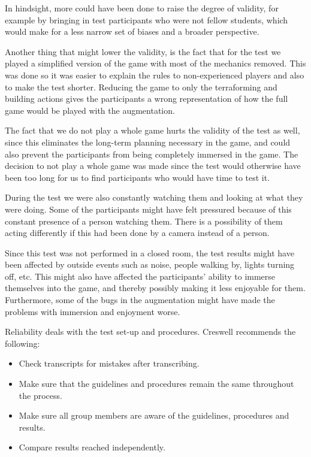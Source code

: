 In hindsight, more could have been done to raise the degree of validity, for example by bringing in test participants who were not fellow students, which would make for a less narrow set of biases and a broader perspective.

Another thing that might lower the validity, is the fact that for the test we played a simplified version of the game with most of the mechanics removed. This was done so it was easier to explain the rules to non-experienced players and also to make the test shorter. Reducing the game to only the terraforming and building actions gives the participants a wrong representation of how the full game would be played with the augmentation.

The fact that we do not play a whole game hurts the validity of the test as well, since this eliminates the long-term planning necessary in the game, and could also prevent the participants from being completely immersed in the game. The decision to not play a whole game was made since the test would otherwise have been too long for us to find participants who would have time to test it.

During the test we were also constantly watching them and looking at what they were doing. Some of the participants might have felt pressured because of this constant presence of a person watching them. There is a possibility of them acting differently if this had been done by a camera instead of a person.   

Since this test was not performed in a closed room, the test results might have been affected by outside events such as noise, people walking by, lights turning off, etc. This might also have affected the participants' ability to immerse themselves into the game, and thereby possibly making it less enjoyable for them. Furthermore, some of the bugs in the augmentation might have made the problems with immersion and enjoyment worse.

Reliability deals with the test set-up and procedures. Creswell \citep{Creswell} recommends the following:

\begin{itemize}
\item Check transcripts for mistakes after transcribing.
\item Make sure that the guidelines and procedures remain the same throughout the process.
\item Make sure all group members are aware of the guidelines, procedures and results. 
\item Compare results reached independently.
\end{itemize}


